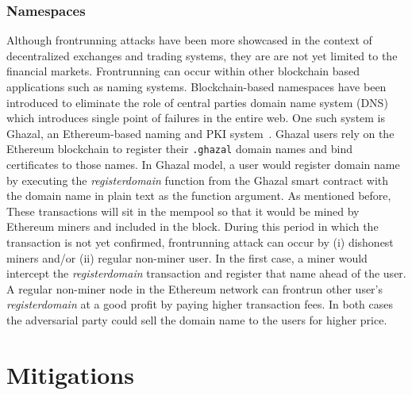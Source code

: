 \subsubsection{Namespaces} Although frontrunning attacks have been more showcased in the context of decentralized exchanges and trading systems, they are are not yet limited to the financial markets. Frontrunning can occur within other blockchain based applications such as naming systems. Blockchain-based namespaces have been introduced to eliminate the role of central parties \ie domain name system (DNS) which introduces single point of failures in the entire web. One such system is Ghazal, an Ethereum-based naming and PKI system~\cite{moosavighazal}. Ghazal users rely on the Ethereum blockchain to register their \texttt{.ghazal} domain names and bind certificates to those names. In Ghazal model, a user would register domain name by executing the \textit{registerdomain} function from the Ghazal smart contract with the domain name in plain text as the function argument. As mentioned before, These transactions will sit in the mempool so that it would be mined by Ethereum miners and included in the block. During this period in which the transaction is not yet confirmed, frontrunning attack can occur by (i) dishonest miners and/or (ii) regular non-miner user. In the first case, a miner would intercept the \textit{registerdomain} transaction and register that name ahead of the user. A regular non-miner node in the Ethereum network can frontrun other user's \textit{registerdomain} at a good profit by paying higher transaction fees. In both cases the adversarial party could sell the domain name to the users for higher price.




\section{Mitigations}

